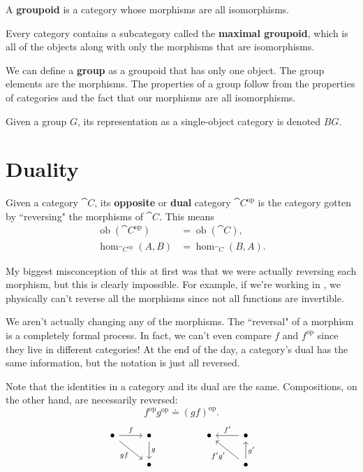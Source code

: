 \documentclass[twoside,10pt]{report}
\DeclareMathOperator{\op}{op}
\DeclareMathOperator{\ob}{ob}
\begin{document}
\begin{defn}[]
A \textbf{groupoid} is a category whose morphisms are all isomorphisms.
\end{defn}
Every category contains a subcategory called the \textbf{maximal groupoid}, which is all of the objects along with only the morphisms that are isomorphisms.

\begin{ex}[]
	We can define a \textbf{group} as a groupoid that has only one object. The group elements are the morphisms. The properties of a group follow from the properties of categories and the fact that our morphisms are all isomorphisms.

	Given a group $G$, its representation as a single-object category is denoted $BG$.
\end{ex}




\section{Duality}


\begin{defn}
	Given a category $\cat{C}$, its \textbf{opposite} or \textbf{dual} category $\cat{C}^{\text{op}}$ is the category gotten by ``reversing" the morphisms of $\cat{C}$. This means
	\begin{align*}
		\ob(\cat{C}^{\op}) &= \ob(\cat{C}),\\
		\hom_{\cat{C}^{\text{op}}}(A,B) &= \hom_{\cat{C}}(B,A).
	\end{align*}
\end{defn}
My biggest misconception of this at first was that we were actually reversing each morphism, but this is clearly impossible. For example, if we're working in , we physically can't reverse all the morphisms since not all functions are invertible.

\begin{note}[]
	We aren't actually changing any of the morphisms. The ``reversal" of a morphism is a completely formal process. In fact, we can't even compare $f$ and $f^{\op}$ since they live in different categories! At the end of the day, a category's dual has the same information, but the notation is just all reversed.
\end{note}

Note that the identities in a category and its dual are the same. Compositions, on the other hand, are necessarily reversed:
\[
	f^{\op} g^{\op} \doteq (gf)^{\op}.
\] 
\[
\begin{tikzcd}
	\bullet \arrow[r, "f"] \arrow[rd, "gf"'] & \bullet \arrow[d, "g"] &  & \bullet & \bullet \arrow[l, "f'"']                    \\
                                         & \bullet                &  &         & \bullet \arrow[lu, "f'g'"] \arrow[u, "g'"']
\end{tikzcd}
\] 
\end{document}
